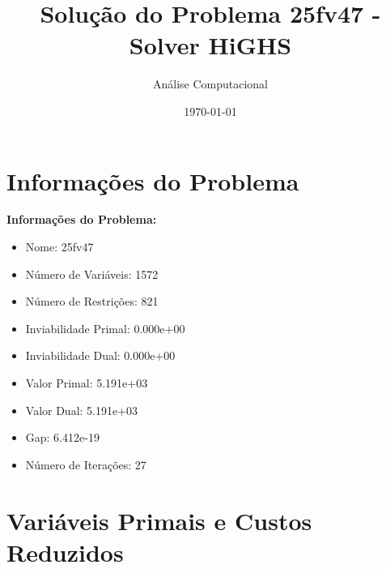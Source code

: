 \documentclass[12pt]{article}
\title{Solução do Problema 25fv47 - Solver HiGHS}
\author{Análise Computacional}
\date{\today}
\begin{document}
\maketitle

\section{Informações do Problema}

\textbf{Informações do Problema:}
\begin{itemize}
\item Nome: 25fv47
\item Número de Variáveis: 1572
\item Número de Restrições: 821
\item Inviabilidade Primal: 0.000e+00
\item Inviabilidade Dual: 0.000e+00
\item Valor Primal: 5.191e+03
\item Valor Dual: 5.191e+03
\item Gap: 6.412e-19
\item Número de Iterações: 27
\end{itemize}


\section{Variáveis Primais e Custos Reduzidos}
\end{document}
